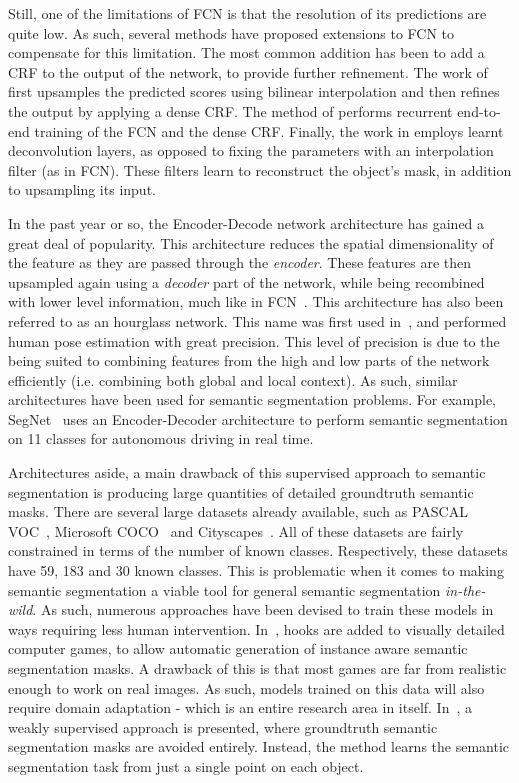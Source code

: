 Still, one of the limitations of FCN is that the resolution of its
predictions are quite low. As such, several methods have proposed
extensions to FCN to compensate for this limitation. The most common
addition has been to add a CRF to the output of the network, to
provide further refinement. The work of \cite{chen2015semantic}
first upsamples the predicted scores using bilinear interpolation
and then refines the output by applying a dense CRF. The method of
\cite{zheng2015conditional} performs recurrent end-to-end training of
the FCN and the dense CRF. Finally, the work in \cite{noh2015learning}
employs learnt deconvolution layers, as opposed to fixing the
parameters with an interpolation filter (as in FCN). These filters
learn to reconstruct the object's mask, in addition to upsampling its
input.

In the past year or so, the Encoder-Decode network architecture has
gained a great deal of popularity. This architecture reduces the
spatial dimensionality of the feature as they are passed through the
\textit{encoder}. These features are then upsampled again using a
\textit{decoder} part of the network, while being recombined with
lower level information, much like in FCN~\cite{long2015fully}. This
architecture has also been referred to as an hourglass network. This
name was first used in~\cite{newell2016stacked}, and performed human
pose estimation with great precision. This level of precision is due
to the being suited to combining features from the high and low parts
of the network efficiently (i.e. combining both global and local
context). As such, similar architectures have been used for semantic
segmentation problems. For example,
SegNet~\cite{badrinarayanan2017segnet} uses an Encoder-Decoder
architecture to perform semantic segmentation on 11 classes for
autonomous driving in real time.

Architectures aside, a main drawback of this supervised approach to
semantic segmentation is producing large quantities of detailed
groundtruth semantic masks. There are several large datasets already
available, such as PASCAL VOC~\cite{everingham2010pascal}, Microsoft
COCO~\cite{lin2014microsoft} and
Cityscapes~\cite{cordts2016cityscapes}. All of these datasets are
fairly constrained in terms of the number of known
classes. Respectively, these datasets have 59, 183 and 30 known
classes. This is problematic when it comes to making semantic
segmentation a viable tool for general semantic segmentation
\textit{in-the-wild}. As such, numerous approaches have been devised
to train these models in ways requiring less human
intervention. In~\cite{richter2016playing}, hooks are added to
visually detailed computer games, to allow automatic generation of
instance aware semantic segmentation masks. A drawback of this is that
most games are far from realistic enough to work on real images. As
such, models trained on this data will also require domain adaptation
- which is an entire research area in itself. In~\cite{bearman2016s},
a weakly supervised approach is presented, where groundtruth semantic
segmentation masks are avoided entirely. Instead, the method learns
the semantic segmentation task from just a single point on each
object.

